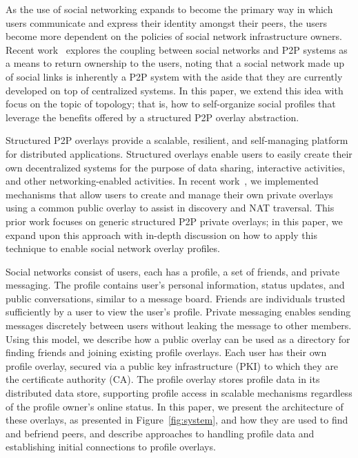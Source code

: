\documentclass[conference]{IEEEtran}
\begin{document}
As the use of social networking expands to become the primary way in which users
communicate and express their identity amongst their peers, the users become
more dependent on the policies of social network infrastructure owners.  Recent
work~\cite{p2p_socialnetwork} explores the coupling between social networks and
P2P systems as a means to return ownership to the users, noting that a social
network made up of social links is inherently a P2P system with the aside that
they are currently developed on top of centralized systems.  In this paper, we
extend this idea with focus on the topic of topology; that is, how to self-organize
social profiles that leverage the benefits offered by a structured P2P overlay
abstraction.

Structured P2P overlays provide a scalable, resilient, and self-managing
platform for distributed applications.  Structured overlays enable users to
easily create their own decentralized systems for the purpose of data sharing,
interactive activities, and other networking-enabled activities.  In recent
work~\cite{icdcs10}, we implemented mechanisms that allow users to create
and manage their own private overlays using a common public overlay to assist
in discovery and NAT traversal. This prior work focuses on generic structured
P2P private overlays; in this paper, we expand upon this approach with in-depth
discussion on how to apply this technique to enable social network overlay
profiles.

Social networks consist of users, each has a profile, a set of friends, and
private messaging.  The profile contains user's personal information, status
updates, and public conversations, similar to a message board.  Friends are
individuals trusted sufficiently by a user to view the user's profile.  Private
messaging enables sending messages discretely between users without leaking the
message to other members.  Using this model, we describe how a public overlay
can be used as a directory for finding friends and joining existing profile
overlays.  Each user has their own profile overlay, secured via a public key
infrastructure (PKI) to which they are the certificate authority (CA).  The
profile overlay stores profile data in its distributed data store, supporting
profile access in scalable mechanisms regardless of the profile owner's online
status.  In this paper, we present the architecture of these overlays, as
presented in Figure~\ref{fig:system}, and how they are used to find and befriend
peers, and describe approaches to handling profile data and establishing initial
connections to profile overlays.
\end{document}
